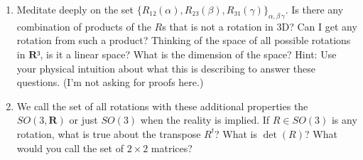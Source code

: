 \begin{enumerate}
\begin{enumerate}
	\end{enumerate}
\item Meditate deeply on the set $\{ R₁₂(α), R₂₃(β), R₃₁(γ)\}_{α, β \, γ}$. Is there any combination of products of the $R$s that is not a rotation in 3D? Can I get any rotation from such a product? Thinking of the space of all possible rotations in $𝐑³$, is it a linear space? What is the dimension of the space? Hint: Use your physical intuition about what this is describing to answer these questions. (I'm not asking for proofs here.) 
\item We call the set of all rotations with these additional properties the $SO(3, 𝐑)$ or just $SO(3)$ when the reality is implied. If $R ∈ SO(3)$ is any rotation, what is true about the transpose $R^t$? What is $\det (R)$? 
What would you call the set of $2\times 2$ matrices?


\end{enumerate}
